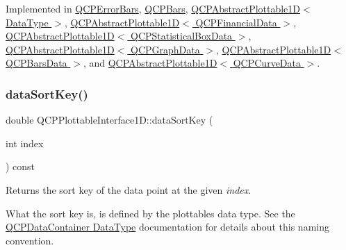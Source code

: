 Implemented in \hyperlink{class_q_c_p_error_bars_a7397bc40751c9c6e2ea188895b2152f8}{Q\+C\+P\+Error\+Bars}, \hyperlink{class_q_c_p_bars_a55cdaf565cd3384158d1f7f89533bc2d}{Q\+C\+P\+Bars}, \hyperlink{class_q_c_p_abstract_plottable1_d_a14cf167457cda163575e6eec2a0b178d}{Q\+C\+P\+Abstract\+Plottable1\+D$<$ Data\+Type $>$}, \hyperlink{class_q_c_p_abstract_plottable1_d_a14cf167457cda163575e6eec2a0b178d}{Q\+C\+P\+Abstract\+Plottable1\+D$<$ Q\+C\+P\+Financial\+Data $>$}, \hyperlink{class_q_c_p_abstract_plottable1_d_a14cf167457cda163575e6eec2a0b178d}{Q\+C\+P\+Abstract\+Plottable1\+D$<$ Q\+C\+P\+Statistical\+Box\+Data $>$}, \hyperlink{class_q_c_p_abstract_plottable1_d_a14cf167457cda163575e6eec2a0b178d}{Q\+C\+P\+Abstract\+Plottable1\+D$<$ Q\+C\+P\+Graph\+Data $>$}, \hyperlink{class_q_c_p_abstract_plottable1_d_a14cf167457cda163575e6eec2a0b178d}{Q\+C\+P\+Abstract\+Plottable1\+D$<$ Q\+C\+P\+Bars\+Data $>$}, and \hyperlink{class_q_c_p_abstract_plottable1_d_a14cf167457cda163575e6eec2a0b178d}{Q\+C\+P\+Abstract\+Plottable1\+D$<$ Q\+C\+P\+Curve\+Data $>$}.

\mbox{\label{class_q_c_p_plottable_interface1_d_afdc92f9f01e7e35f2e96b2ea9dc14ae7}} 
\subsubsection{\texorpdfstring{data\+Sort\+Key()}{dataSortKey()}}
{\footnotesize\ttfamily double Q\+C\+P\+Plottable\+Interface1\+D\+::data\+Sort\+Key (\begin{DoxyParamCaption}\item[{int}]{index }\end{DoxyParamCaption}) const\hspace{0.3cm}{\ttfamily [pure virtual]}}

Returns the sort key of the data point at the given {\itshape index}.

What the sort key is, is defined by the plottable\textquotesingle{}s data type. See the \hyperlink{class_q_c_p_data_container_qcpdatacontainer-datatype}{Q\+C\+P\+Data\+Container Data\+Type} documentation for details about this naming convention. 

